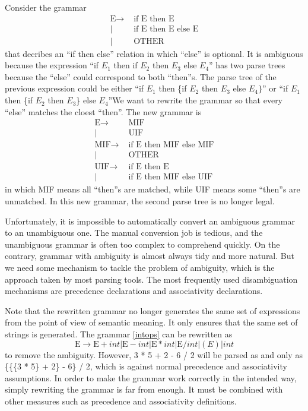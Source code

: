Consider the grammar
\begin{equation*}
\begin{split}
\text{E}\rightarrow &\text{ if E then E}\\
|&\text{ if E then E else E}\\
|&\text{ OTHER}
\end{split}
\end{equation*}
that decribes an ``if then else'' relation in which ``else'' is optional. It is ambiguous because the expression 
``if $E_1$ then if $E_2$ then $E_3$ else $E_4$'' has two parse trees because the ``else'' could correspond to both ``then''s. The parse tree of the previous expression could be either ``if $E_1$ then \{if $E_2$ then $E_3$ else $E_4\}$'' or ``if $E_1$ then \{if $E_2$ then $E_3$\} else $E_4$''We want to rewrite the grammar so that every ``else'' matches the cloest ``then''. The new grammar is
\begin{equation*}
\begin{split}
\text{E}\rightarrow &\text{ MIF}\\
|&\text{ UIF}\\
\text{MIF}\rightarrow &\text{ if E then MIF else MIF}\\
|&\text{ OTHER}\\
\text{UIF}\rightarrow &\text{ if E then E}\\
|&\text{ if E then MIF else UIF}
\end{split}
\end{equation*}
in which MIF means all ``then''s are matched, while UIF means some ``then''s are unmatched. In this new grammar, the second parse tree is no longer legal.

Unfortunately, it is impossible to automatically convert an ambiguous grammar to an unambiguous one. The manual conversion job is tedious, and the unambiguous grammar is often too complex to comprehend quickly. On the contrary, grammar with ambiguity is almost always tidy and more natural. But we need some mechanism to tackle the problem of ambiguity, which is the approach taken by most parsing tools. The most frequently used disambiguation mechanisms are precedence declarations and associativity declarations.

Note that the rewritten grammar no longer generates the same set of expressions from the point of view of semantic meaning. It only ensures that the same set of strings is generated. The grammar \eqref{intops} can be rewritten as 
\begin{equation*}
\text{E}\rightarrow \text{E} + int |\text{E} - int | \text{E} * int |\text{E} / int | (E) | int
\end{equation*}
to remove the ambiguity. However, 3 * 5 + 2 - 6 / 2 will be parsed as and only as \{\{\{3 * 5\} + 2\} - 6\} / 2, which is against normal precedence and associativity assumptions. In order to make the grammar work correctly in the intended way, simply rewriting the grammar is far from enough. It must be combined with other measures such as precedence and associativity definitions. 
